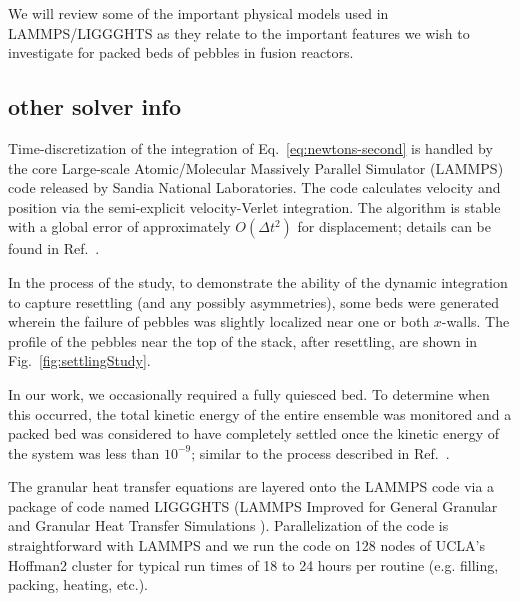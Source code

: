 We will review some of the important physical models used in LAMMPS/LIGGGHTS as they relate to the important features we wish to investigate for packed beds of pebbles in fusion reactors.

\subsection{other solver info}

Time-discretization of the integration of Eq.~\ref{eq:newtons-second} is handled by the core Large-scale Atomic/Molecular Massively Parallel Simulator (LAMMPS) code released by Sandia National Laboratories\cite{Plimpton1995}. The code calculates velocity and position via the semi-explicit velocity-Verlet integration. The algorithm is stable with a global error of approximately $O(\Delta t^2)$ for displacement; details can be found in Ref.~\cite{Grubmuller1991}.

In the process of the study, to demonstrate the ability of the dynamic integration to capture resettling (and any possibly asymmetries), some beds were generated wherein the failure of pebbles was slightly localized near one or both $x$-walls. The profile of the pebbles near the top of the stack, after resettling, are shown in Fig.~\ref{fig:settlingStudy}. 

In our work, we occasionally required a fully quiesced bed. To determine when this occurred, the total kinetic energy of the entire ensemble was monitored and a packed bed was considered to have completely settled once the kinetic energy of the system was less than $10^{-9}$; similar to the process described in Ref.~\cite{Silbert2002}. 


The granular heat transfer equations are layered onto the LAMMPS code via a package of code named LIGGGHTS (LAMMPS Improved for General Granular and Granular Heat Transfer Simulations \cite{Kloss2012}). Parallelization of the code is straightforward with LAMMPS and we run the code on 128 nodes of UCLA's Hoffman2 cluster for typical run times of 18 to 24 hours per routine ({e.g.} filling, packing, heating, etc.).